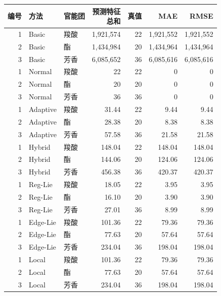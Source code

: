 \begin{table}[htbp]
  \centering\small
  \setlength{\tabcolsep}{4pt}
  \begin{tabular}{@{}rllrrrr@{}}
    \toprule
    编号 & 方法 & 官能团 & \shortstack{预测特征\\总和} & 真值 & MAE & RMSE \\
    \midrule
    1 & Basic    & 羧酸 & 1,921,574 & 22 & 1,921,552 & 1,921,552 \\
    2 & Basic    & 酯   & 1,434,984 & 20 & 1,434,964 & 1,434,964 \\
    3 & Basic    & 芳香 & 6,085,652 & 36 & 6,085,616 & 6,085,616 \\
    1 & Normal   & 羧酸 & 22        & 22 & 0         & 0 \\
    2 & Normal   & 酯   & 20        & 20 & 0         & 0 \\
    3 & Normal   & 芳香 & 36        & 36 & 0         & 0 \\
    1 & Adaptive & 羧酸 & 31.44     & 22 & 9.44      & 9.44 \\
    2 & Adaptive & 酯   & 28.38     & 20 & 8.38      & 8.38 \\
    3 & Adaptive & 芳香 & 57.58     & 36 & 21.58     & 21.58 \\
    1 & Hybrid   & 羧酸 & 148.04    & 22 & 148.04    & 148.04 \\
    2 & Hybrid   & 酯   & 144.06    & 20 & 124.06    & 124.06 \\
    3 & Hybrid   & 芳香 & 456.38    & 36 & 420.37    & 420.37 \\
    1 & Reg-Lie  & 羧酸 & 18.05     & 22 & 3.95      & 3.95 \\
    2 & Reg-Lie  & 酯   & 16.10     & 20 & 3.90      & 3.90 \\
    3 & Reg-Lie  & 芳香 & 27.01     & 36 & 8.99      & 8.99 \\
    1 & Edge-Lie & 羧酸 & 101.36    & 22 & 79.36     & 79.36 \\
    2 & Edge-Lie & 酯   & 77.63     & 20 & 57.64     & 57.64 \\
    3 & Edge-Lie & 芳香 & 234.04    & 36 & 198.04    & 198.04 \\
    1 & Local    & 羧酸 & 101.36    & 22 & 79.36     & 79.36 \\
    2 & Local    & 酯   & 77.63     & 20 & 57.64     & 57.64 \\
    3 & Local    & 芳香 & 234.04    & 36 & 198.04    & 198.04 \\
    \bottomrule
  \end{tabular}
\end{table}

